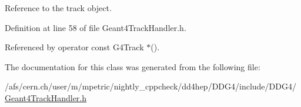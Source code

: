 Reference to the track object. 



Definition at line 58 of file Geant4\+Track\+Handler.\+h.



Referenced by operator const G4\+Track $\ast$().



The documentation for this class was generated from the following file\+:\begin{DoxyCompactItemize}
\item 
/afs/cern.\+ch/user/m/mpetric/nightly\+\_\+cppcheck/dd4hep/\+D\+D\+G4/include/\+D\+D\+G4/\hyperlink{_geant4_track_handler_8h}{Geant4\+Track\+Handler.\+h}\end{DoxyCompactItemize}
